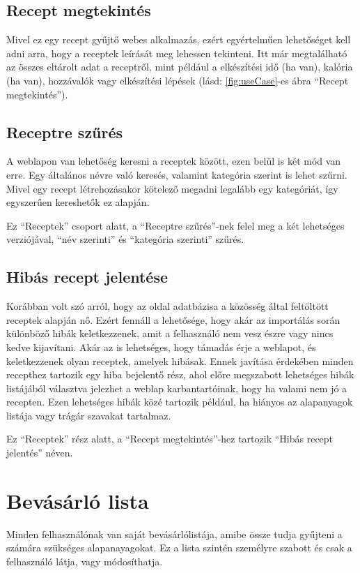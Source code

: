 \documentclass[12pt]{report}
\theoremstyle{definition}
\begin{document}
\subsection{Recept megtekintés}
Mivel ez egy recept gyűjtő webes alkalmazás, ezért egyértelműen lehetőséget kell adni arra, hogy a receptek leírását meg lehessen tekinteni. Itt már megtalálható az összes eltárolt adat a receptről, mint például a elkészítési idő (ha van), kalória (ha van), hozzávalók vagy elkészítési lépések (lásd: \ref{fig:useCase}-es ábra “Recept megtekintés”).

\subsection{Receptre szűrés}
A weblapon van lehetőség keresni a receptek között, ezen belül is két mód van erre. Egy általános névre való keresés, valamint kategória szerint is lehet szűrni. Mivel egy recept létrehozásakor kötelező megadni legalább egy kategóriát, így egyszerűen kereshetők ez alapján.

Ez  “Receptek” csoport alatt, a “Receptre szűrés”-nek felel meg a két lehetséges verziójával, “név szerinti” és “kategória szerinti” szűrés.


\subsection{Hibás recept jelentése}
Korábban volt szó arról, hogy az oldal adatbázisa a közösség által feltöltött receptek alapján nő. Ezért fennáll a lehetősége, hogy akár az importálás során különböző hibák keletkezzenek, amit a felhasználó nem vesz észre vagy nincs kedve kijavítani. Akár az is lehetséges, hogy támadás érje a weblapot, és keletkezzenek olyan receptek, amelyek hibásak. Ennek javítása érdekében minden recepthez tartozik egy hiba bejelentő rész, ahol előre megszabott lehetséges hibák listájából választva jelezhet a weblap karbantartóinak, hogy ha valami nem jó a recepten. Ezen lehetséges hibák közé tartozik például, ha hiányos az alapanyagok listája vagy trágár szavakat tartalmaz.

Ez  “Receptek” rész alatt, a “Recept megtekintés”-hez tartozik “Hibás recept jelentés” néven.


\section{Bevásárló lista}
Minden felhasználónak van saját bevásárlólistája, amibe össze tudja gyűjteni a számára szükséges alapanayagokat. Ez a lista szintén személyre szabott és csak a felhasználó látja, vagy módosíthatja.
\end{document}
